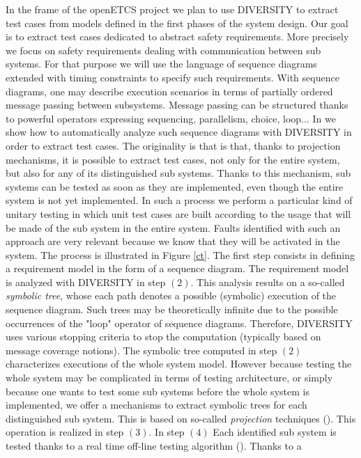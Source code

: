 In the frame of the openETCS project we plan to use DIVERSITY to
extract test cases from models defined in the first phases of the
system design. Our goal is to extract test cases dedicated to abstract
safety requirements. More precisely we focus on safety requirements
dealing with communication between sub systems. For that purpose we
will use the language of sequence diagrams extended with timing
constraints to specify such requirements. With sequence diagrams, one
may describe execution scenarios in terms of partially ordered message
passing between subsystems. Message passing can be structured thanks
to powerful operators expressing sequencing, parallelism, choice,
loop...  In \cite{BGS11} we show how to automatically analyze such
sequence diagrams with DIVERSITY in order to extract test cases. The
originality is that is that, thanks to projection mechanisms, it is
possible to extract test cases, not only for the entire system, but
also for any of its distinguished sub systems. Thanks to this
mechanism, sub systems can be tested as soon as they are implemented,
even though the entire system is not yet implemented. In such a
process we perform a particular kind of unitary testing in which unit
test cases are built according to the usage that will be made of the
sub system in the entire system.  Faults identified with such an
approach are very relevant because we know that they will be activated
in the system. The process is illustrated in Figure \ref{ct}.  The
first step consists in defining a requirement model in the form of a
sequence diagram. The requirement model is analyzed with DIVERSITY in
step $(2)$. This analysis results on a so-called {\em symbolic tree},
whose each path denotes a possible (symbolic) execution of the
sequence diagram.  Such trees may be theoretically infinite due to the
possible occurrences of the "loop" operator of sequence
diagrams. Therefore, DIVERSITY uses various stopping criteria to stop
the computation (typically based on message coverage notions).  The
symbolic tree computed in step $(2)$ characterizes executions of the
whole system model. However because testing the whole system may be
complicated in terms of testing architecture, or simply because one
wants to test some sub systems before the whole system is implemented,
we offer a mechanisms to extract symbolic trees for each distinguished
sub system. This is based on so-called {\em projection} techniques
(\cite{FGG07,EGL11}). This operation is realized in step $(3)$. In
step $(4)$ Each identified sub system is tested thanks to a real time
off-line testing algorithm (\cite{BEGL12}).  Thanks to a
